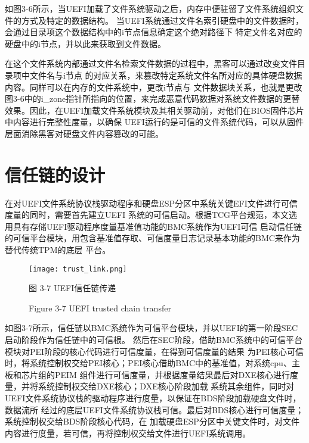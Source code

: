 如图3-6所示，当UEFI加载了文件系统驱动之后，内存中便驻留了文件系统组织文件的方式及特定的数据结构。
当UEFI系统通过文件名索引硬盘中的文件数据时，会通过目录项这个数据结构中的i节点信息确定这个绝对路径下
特定文件名对应的硬盘中的i节点，并以此来获取到文件数据。
\par 在这个文件系统内部通过文件名检索文件数据的过程中，黑客可以通过改变文件目录项中文件名与i节点
的对应关系，来篡改特定系统文件名所对应的具体硬盘数据内容。同样可以在内存的文件系统中，更改i节点与
文件数据块关系，也就是更改图3-6中的i\_zone指针所指向的位置，来完成恶意代码数据对系统文件数据的更替
效果。因此，在UEFI加载文件系统模块及其相关驱动前，对他们在BIOS固件芯片中内容进行完整性度量，以确保
UEFI运行的是可信的文件系统代码，可以从固件层面消除黑客对硬盘文件内容篡改的可能。

%
%
\section{信任链的设计}
在对UEFI文件系统协议栈驱动程序和硬盘ESP分区中系统关键EFI文件进行可信度量的同时，需要首先建立UEFI
系统的可信启动。根据TCG平台规范，本文选用具有存储UEFI驱动程序度量基准值功能的BMC系统作为UEFI可信
启动信任链的可信平台模块，用包含基准值存取、可信度量日志记录基本功能的BMC来作为替代传统TPM的底层
平台。

\begin{figure}[htb]
    \label{ffs_format}
    \vspace{0cm}   
    \setlength{\abovecaptionskip}{0.3cm}
	\centering
    \texttt{[image: trust\_link.png]}
    \caption*{图 3-7 UEFI信任链传递}
    \setlength{\belowcaptionskip}{-0.7cm}
    \caption*{Figure 3-7 UEFI trusted chain transfer}
\end{figure}

如图3-7所示，信任链以BMC系统作为可信平台模块，并以UEFI的第一阶段SEC启动阶段作为信任链中的可信根。
然后在SEC阶段，借助BMC系统中的可信平台模块对PEI阶段的核心代码进行可信度量，在得到可信度量的结果
为PEI核心可信时，将系统控制权交给PEI核心；PEI核心借助BMC中的基准值，对系统cpu、主板和芯片组的PEIM
组件进行可信度量，并根据度量结果最后对DXE核心进行度量，并将系统控制权交给DXE核心；DXE核心阶段加载
系统其余组件，同时对UEFI文件系统协议栈的驱动程序进行度量，以保证在BDS阶段加载硬盘文件时，数据流所
经过的底层UEFI文件系统协议栈可信。最后对BDS核心进行可信度量；系统控制权交给BDS阶段核心代码，在
加载硬盘ESP分区中关键文件时，对文件内容进行度量，若可信，再将控制权交给文件进行UEFI系统调用。

